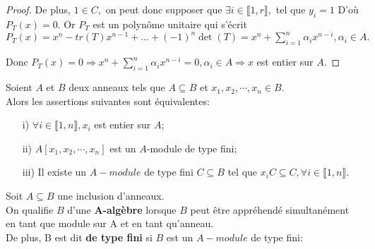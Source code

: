 \begin{proof}
	De plus, $1\in C,$ on peut donc supposer que $\exists i\in \llbracket 1, r \rrbracket ,$ tel que $y_{i}=1$
	D'où $P_{T}(x)=0.$
	Or $P_{T}$ est un polynôme unitaire qui s'écrit\\ $P_{T}(x)=x^{n}-tr(T)x^{n-1}+...+(-1)^{n}\det
	(T)=x^{n}+\sum\limits_{i=1}^{n}\alpha _{i}x^{n-i},\alpha _{i}\in A.$
	
	Donc $P_{T}(x)=0\Rightarrow x^{n}+\sum\limits_{i=1}^{n}\alpha
	_{i}x^{n-i}=0,\alpha _{i}\in A\Rightarrow x$ est entier sur $A.$
	
\end{proof}
\begin{moncorollaire}
	Soient $A$ et $B$ deux anneaux tels que $A \subseteq  B$ et $x_1, x_2, \cdots, x_n \in B$.\\
	Alors les assertions suivantes sont équivalentes:
	\begin{enumerate}
		\item[i)]$\forall i \in \llbracket 1, n \rrbracket, x_i$ est entier sur $A$;
		\item[ii)]$A[x_1, x_2, \cdots, x_n]$ est un $A$-module de type fini;
		\item[iii)]Il existe un $A-module$ de type fini $C \subseteq  B$ tel que $x_i C \subseteq  C, \forall i \in \llbracket 1, n \rrbracket$.
	\end{enumerate}
\end{moncorollaire}

\begin{madefinition}
	Soit $A \subseteq B$ une inclusion d'anneaux.\\
	On qualifie $B$ d'une \textbf{A-algèbre} lorsque $B$ peut être appréhendé simultanément en tant que module sur A et en tant qu'anneau.\\
	De plus, B est dit \textbf{de type fini} si $B$ est un $A-module$ de type fini:
\end{madefinition}


